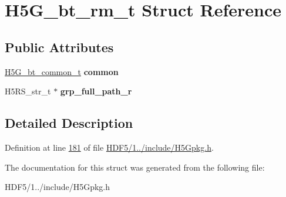 \hypertarget{struct_h5_g__bt__rm__t}{}\section{H5\+G\+\_\+bt\+\_\+rm\+\_\+t Struct Reference}
\label{struct_h5_g__bt__rm__t}
\subsection*{Public Attributes}
\begin{DoxyCompactItemize}
\item 
\mbox{\label{struct_h5_g__bt__rm__t_a54175db48a0f339b5750525e00f9c992}} 
\hyperlink{struct_h5_g__bt__common__t}{H5\+G\+\_\+bt\+\_\+common\+\_\+t} {\bfseries common}
\item 
\mbox{\label{struct_h5_g__bt__rm__t_a20578007b1136d42ad77bac1e93d38cd}} 
H5\+R\+S\+\_\+str\+\_\+t $\ast$ {\bfseries grp\+\_\+full\+\_\+path\+\_\+r}
\end{DoxyCompactItemize}


\subsection{Detailed Description}


Definition at line \hyperlink{_h_d_f5_21_810_81_2include_2_h5_gpkg_8h_source_l00181}{181} of file \hyperlink{_h_d_f5_21_810_81_2include_2_h5_gpkg_8h_source}{H\+D\+F5/1../include/\+H5\+Gpkg.\+h}.



The documentation for this struct was generated from the following file\+:\begin{DoxyCompactItemize}
\item 
H\+D\+F5/1../include/\+H5\+Gpkg.\+h\end{DoxyCompactItemize}

